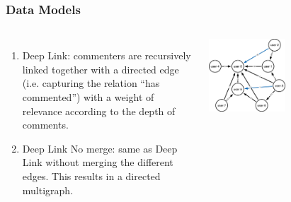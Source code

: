 \documentclass[aspectratio=169]{beamer}
\begin{document}
\begin{frame}[t]
    \frametitle{Data Models}
    \begin{columns}
        \begin{enumerate}
            \suite
            \item Deep Link: commenters are recursively linked together with a directed edge (i.e. capturing the relation ``has commented'') with a weight of relevance according to the depth of comments.
            \item Deep Link No merge: same as Deep Link without merging the different edges. This results in a directed multigraph.
        \end{enumerate}
        \hspace{1.0cm}
        \includegraphics[width=0.5\textwidth]{figures/graph_model.png}
    \end{columns}
\end{frame}
\end{document}
